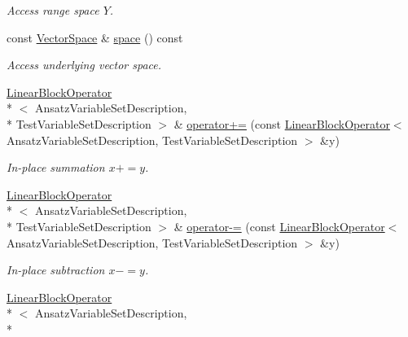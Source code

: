 \begin{DoxyCompactItemize}
\begin{DoxyCompactList}\small\item\em Access range space $Y$. \end{DoxyCompactList}\item 
\hypertarget{classSpacy_1_1VectorBase_aa999dbf9d679d895dfe04c10fbf9f5e9}{const \hyperlink{classSpacy_1_1VectorSpace}{Vector\-Space} \& \hyperlink{classSpacy_1_1VectorBase_aa999dbf9d679d895dfe04c10fbf9f5e9}{space} () const }\label{classSpacy_1_1VectorBase_aa999dbf9d679d895dfe04c10fbf9f5e9}

\begin{DoxyCompactList}\small\item\em Access underlying vector space. \end{DoxyCompactList}\item 
\hyperlink{classSpacy_1_1KaskadeParabolic_1_1PDE_1_1LinearBlockOperator}{Linear\-Block\-Operator}\\*
$<$ Ansatz\-Variable\-Set\-Description, \\*
Test\-Variable\-Set\-Description $>$ \& \hyperlink{classSpacy_1_1AddArithmeticOperators_afad1d01e1e8c6f75290ac46d9b047ea8}{operator+=} (const \hyperlink{classSpacy_1_1KaskadeParabolic_1_1PDE_1_1LinearBlockOperator}{Linear\-Block\-Operator}$<$ Ansatz\-Variable\-Set\-Description, Test\-Variable\-Set\-Description $>$ \&y)
\begin{DoxyCompactList}\small\item\em In-\/place summation $ x+=y$. \end{DoxyCompactList}\item 
\hyperlink{classSpacy_1_1KaskadeParabolic_1_1PDE_1_1LinearBlockOperator}{Linear\-Block\-Operator}\\*
$<$ Ansatz\-Variable\-Set\-Description, \\*
Test\-Variable\-Set\-Description $>$ \& \hyperlink{classSpacy_1_1AddArithmeticOperators_a9fa91e177d13203cfe8cfa991c64ca36}{operator-\/=} (const \hyperlink{classSpacy_1_1KaskadeParabolic_1_1PDE_1_1LinearBlockOperator}{Linear\-Block\-Operator}$<$ Ansatz\-Variable\-Set\-Description, Test\-Variable\-Set\-Description $>$ \&y)
\begin{DoxyCompactList}\small\item\em In-\/place subtraction $ x-=y$. \end{DoxyCompactList}\item 
\hyperlink{classSpacy_1_1KaskadeParabolic_1_1PDE_1_1LinearBlockOperator}{Linear\-Block\-Operator}\\*
$<$ Ansatz\-Variable\-Set\-Description, \\*

\end{DoxyCompactItemize}
